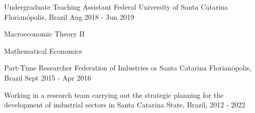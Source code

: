 \begin{cventries}
\cventry
    {Undergraduate Teaching Assistant} %
    {Federal University of Santa Catarina} %
    {Florianópolis, Brazil} %
    {Aug 2018 - Jun 2019} %
    {
      \begin{cvitems} %
        \item {Macroeconomic Theory II}
        \item {Mathematical Economics}
      \end{cvitems}
    }

\cventry
    {Part-Time Researcher}
    {Federation of Industries os Santa Catarina}
    {Florianópolis, Brazil}
    {Sept 2015 - Apr 2016}
    {
        \begin{cvitems}
            \item {Working in a research team carrying out the strategic planning for the development of industrial sectors in Santa Catarina State, Brazil, 2012 - 2022}
        \end{cvitems}
    }

\end{cventries}

